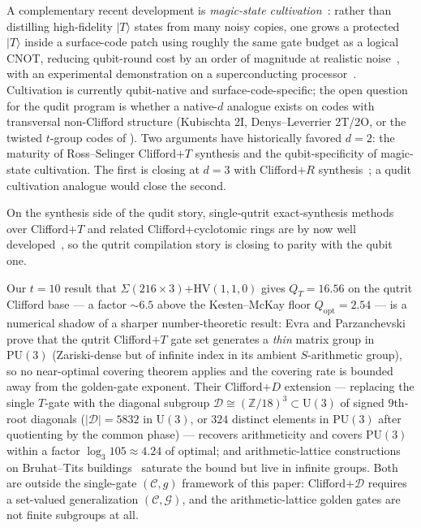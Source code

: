 \documentclass[twocolumn,superscriptaddress,showpacs,nofootinbib,notitlepage,preprintnumbers,secnumarabic,amssymb, nobibnotes, aps, prd]{revtex4-2}
\newcommand{\QT}{Q_{T}}              %
\newcommand{\Popt}{Q_{\mathrm{opt}}} %
\newcommand{\HV}[3]{\mathrm{HV}(#1,#2,#3)} %
\newcommand{\Sigmathree}[1]{\Sigma(#1\!\times\!3)} %
\begin{document}
A complementary recent development is \emph{magic-state cultivation}~\cite{Gidney:2024cultivation}: rather than distilling high-fidelity $|T\rangle$ states from many noisy copies, one grows a protected $|T\rangle$ inside a surface-code patch using roughly the same gate budget as a logical CNOT, reducing qubit-round cost by an order of magnitude at realistic noise~\cite{Vaknin:2025cultivation}, with an experimental demonstration on a superconducting processor~\cite{Rosenfeld:2025cultivation}. Cultivation is currently qubit-native and surface-code-specific; the open question for the qudit program is whether a native-$d$ analogue exists on codes with transversal non-Clifford structure (Kubischta 2I, Denys--Leverrier 2T/2O, or the twisted $t$-group codes of \cite{KubischtaTeixeira:2024}). Two arguments have historically favored $d=2$: the maturity of Ross--Selinger Clifford$+T$ synthesis and the qubit-specificity of magic-state cultivation. The first is closing at $d=3$ with Clifford$+R$ synthesis~\cite{Gustafson:2025qutrit}; a qudit cultivation analogue would close the second.

On the synthesis side of the qudit story, single-qutrit exact-synthesis methods over Clifford$+T$ and related Clifford+cyclotomic rings are by now well developed~\cite{Prakash:2018nqcl,Glaudell:2019qcanon,Kalra:2025qutrit,Gustafson:2025qutrit}, so the qutrit compilation story is closing to parity with the qubit one.

Our $t=10$ result that $\Sigmathree{216}$+$\HV{1}{1}{0}$ gives $\QT = 16.56$ on the qutrit Clifford base --- a factor $\sim\!6.5$ above the Kesten--McKay floor $\Popt = 2.54$ --- is a numerical shadow of a sharper number-theoretic result: Evra and Parzanchevski~\cite{EvraParzanchevski:2024cliffordT} prove that the qutrit Clifford$+T$ gate set generates a \emph{thin} matrix group in $\mathrm{PU}(3)$ (Zariski-dense but of infinite index in its ambient $S$-arithmetic group), so no near-optimal covering theorem applies and the covering rate is bounded away from the golden-gate exponent. Their Clifford$+D$ extension --- replacing the single $T$-gate with the diagonal subgroup $\mathcal{D} \cong (\mathbb{Z}/18)^3 \subset \mathrm{U}(3)$ of signed $9$th-root diagonals ($|\mathcal{D}| = 5832$ in $\mathrm{U}(3)$, or $324$ distinct elements in $\mathrm{PU}(3)$ after quotienting by the common phase) --- recovers arithmeticity and covers $\mathrm{PU}(3)$ within a factor $\log_3 105 \approx 4.24$ of optimal; and arithmetic-lattice constructions on Bruhat--Tits buildings~\cite{EvraParzanchevski:2022pu3} saturate the bound but live in infinite groups. Both are outside the single-gate $(\mathcal{C},g)$ framework of this paper: Clifford$+\mathcal{D}$ requires a set-valued generalization $(\mathcal{C},\mathcal{G})$, and the arithmetic-lattice golden gates are not finite subgroups at all.
\end{document}

